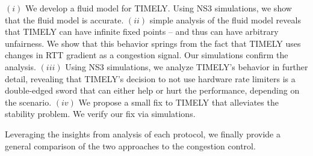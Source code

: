  $(i)$ We develop a fluid model for TIMELY. Using NS3 simulations,
we show that the fluid model is accurate. $(ii)$ simple analysis of the fluid model
reveals that TIMELY can have infinite fixed points -- and thus can have
arbitrary unfairness. We show that this behavior springs from the fact that
TIMELY uses changes in RTT gradient as a congestion signal.
Our simulations confirm the analysis. $(iii)$ Using NS3
simulations, we analyze TIMELY's behavior in further detail, revealing that
TIMELY's decision to not use hardware rate limiters is a double-edged sword that
can either help or hurt the performance, depending on the scenario. $(iv)$ We
propose a small fix to TIMELY that alleviates the stability problem. We verify
our fix via simulations.

Leveraging the insights from analysis of each protocol, we finally provide a
general comparison of the two approaches to the congestion control.
